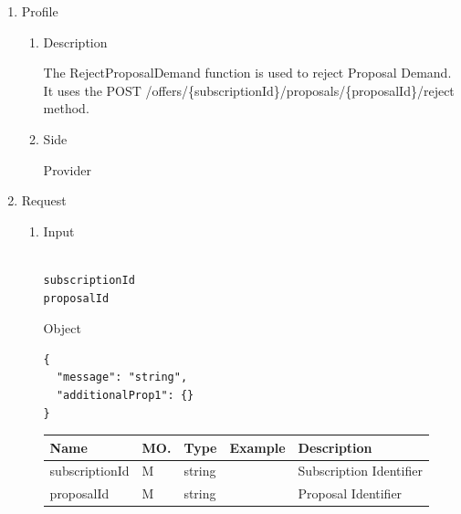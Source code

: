 
\begin{enumerate}

\item Profile

\begin{enumerate}

\item Description

The RejectProposalDemand function is used to reject Proposal Demand. \\
It uses the POST /offers/\{subscriptionId\}/proposals/\{proposalId\}/reject method.

\item Side

Provider

\end{enumerate}

\item Request

\begin{enumerate}

\item Input

\begin{tcolorbox}[boxrule=0pt, frame empty]
\begin{verbatim}

subscriptionId
proposalId

\end{verbatim}
\end{tcolorbox}

Object
\begin{tcolorbox}[boxrule=0pt, frame empty]
\begin{verbatim}
{
  "message": "string",
  "additionalProp1": {}
}
\end{verbatim}
\end{tcolorbox}

\begin{table}[H]
\footnotesize

\begin{center}
\begin{tabular}{|p{3cm}|l|p{3cm}|p{3cm}|p{4cm}|} 
\hline
\rowcolor{lightgray}	Name	& MO.	& Type	& Example & 	Description \\
\hline

subscriptionId		& M	& 	string			&		&	Subscription Identifier \\ 
\hline

proposalId			& M & 	string			&		&	Proposal Identifier \\
\hline	


\end{tabular}
\end{center}
\end{table}
\end{enumerate}
\end{enumerate}
